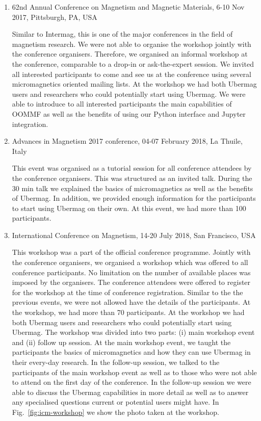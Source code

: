 \documentclass{deliverablereport}
\begin{document}
\begin{enumerate}
\item 62nd Annual Conference on Magnetism and Magnetic Materials, 6-10
Nov 2017, Pittsburgh, PA, USA

    Similar to Intermag, this is one of the major conferences in the
field of magnetism research. We were not able to organise the workshop
jointly with the conference organisers. Therefore, we organised an
informal workshop at the conference, comparable to a drop-in or
ask-the-expert session. We invited all
interested participants to come and see us at the conference using
several micromagnetics oriented mailing lists. At the workshop we had
both Ubermag users and researchers who could potentially start using
Ubermag. We were able to introduce to all interested participants the
main capabilities of OOMMF as well as the benefits of using our Python
interface and Jupyter integration.

\item Advances in Magnetism 2017 conference, 04-07 February 2018, La Thuile,
Italy

    This event was organised as a tutorial session for all conference
attendees by the conference organisers. This was structured as an
invited talk. During the 30 min talk we explained the basics of
micromagnetics as well as the benefits of Ubermag. In addition, we
provided enough information for the participants to start using
Ubermag on their own. At this event, we had more than 100
participants.

\item International Conference on Magnetism, 14-20 July 2018, San
Francisco, USA

    This workshop was a part of the official conference
    programme. Jointly with the conference organisers, we organised a
    workshop which was offered to all conference participants. No
    limitation on the number of available places was imposed by the
    organisers. The conference attendees were offered to register for
    the workshop at the time of conference registration. Similar to
    the the previous events, we were not allowed have the details of
    the participants. At the workshop, we had more than 70
    participants. At the workshop we had both Ubermag users and
    researchers who could potentially start using Ubermag. The
    workshop was divided into two parts: (i) main workshop event and
    (ii) follow up session. At the main workshop event, we taught the
    participants the basics of micromagnetics and how they can use
    Ubermag in their every-day research. In the follow-up session, we
    talked to the participants of the main workshop event as well as
    to those who were not able to attend on the first day of the
    conference. In the follow-up session we were able to discuss the
    Ubermag capabilities in more detail as well as to answer any
    specialised questions current or potential users might have. In
    Fig.~\ref{fig:icm-workshop} we show the photo taken at the
    workshop.


\end{enumerate}
\end{document}
